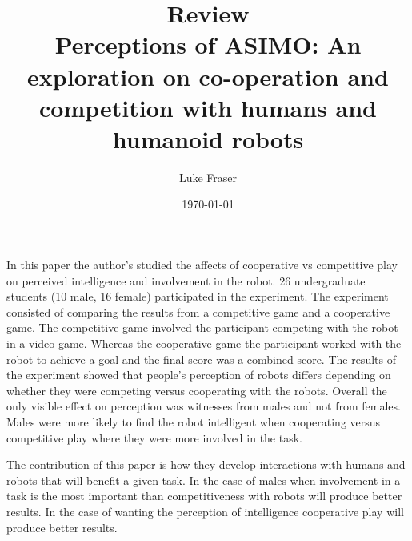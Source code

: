 \documentclass{article}
\begin{document}
\title{{\large Review} \\ Perceptions of ASIMO: An exploration on co-operation and competition with humans and humanoid robots}
\author{Luke Fraser}
\date{\today}
\maketitle

\begingroup
\renewcommand{\section}[2]{}


\endgroup

\section*{Summary}
In this paper the author's studied the affects of cooperative vs competitive play on perceived intelligence and involvement in the robot. 26 undergraduate students (10 male, 16 female) participated in the experiment. The experiment consisted of comparing the results from a competitive game and a cooperative game. The competitive game involved the participant competing with the robot in a video-game. Whereas the cooperative game the participant worked with the robot to achieve a goal and the final score was a combined score. The results of the experiment showed that people's perception of robots differs depending on whether they were competing versus cooperating with the robots. Overall the only visible effect on perception was witnesses from males and not from females. Males were more likely to find the robot intelligent when cooperating versus competitive play where they were more involved in the task.
\section*{Strengths}
The contribution of this paper is how they develop interactions with humans and robots that will benefit a given task. In the case of males when involvement in a task is the most important than competitiveness with robots will produce better results. In the case of wanting the perception of intelligence cooperative play will produce better results.
\end{document}
